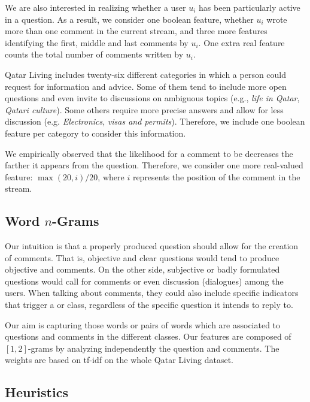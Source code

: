 We are also interested in realizing whether a user $u_i$ has been particularly 
active in a question. As a result, we consider one boolean feature, whether 
$u_i$ wrote more than one comment in the current stream, and three more features 
identifying the first, middle and last comments by $u_i$. One extra real feature 
counts the total number of comments written by $u_i$.

Qatar Living includes twenty-six different categories in which a person could 
request for information and advice. Some of them tend to include more open 
questions and even invite to discussions on ambiguous topics (e.g., \textit{life 
in Qatar}, \textit{Qatari culture}). Some others require more precise answers 
and allow for less discussion (e.g. \textit{Electronics}, \textit{visas and 
permits}). Therefore, we include one boolean feature per category to consider 
this information. 
 
We empirically observed that the likelihood for a comment to be \good decreases 
the farther it appears from the question. Therefore, we consider one more 
real-valued feature: $\max(20, i)/20$, where $i$ represents the position of 
the comment in the stream.


\subsection{Word $n$-Grams}
\label{ssub:ngrams}

Our intuition is that a properly produced question should allow for the creation 
of \good comments. That is, objective and clear questions would tend to produce 
objective and \good comments. On the other side, subjective or badly formulated 
questions would call for \bad comments or even discussion (\ie dialogues) among 
the users. When talking about comments, they could also include 
specific indicators that trigger a \good or \bad class, regardless of the 
specific question it intends to reply to. 

Our aim is capturing those words or pairs of words which are associated to 
questions and comments in the different classes. Our features are composed of 
$[1,2]$-grams by analyzing independently the question and comments. The weights 
are based on tf-idf on the whole Qatar Living dataset. 

\subsection{Heuristics}
\label{ssub:heuristics}

